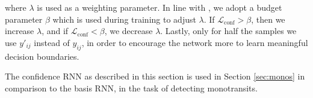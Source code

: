 \noindent where $\lambda$ is used as a weighting parameter. In line with \cite{devries2018learning}, we adopt a budget parameter $\beta$ which is used during training to adjust $\lambda$. If $\mathcal{L}_{\text{conf}} > \beta$, then we increase $\lambda$, and if $\mathcal{L}_{\text{conf}} < \beta$, we decrease $\lambda$. Lastly, only for half the samples we use $y'_{ij}$ instead of $y_{ij}$, in order to encourage the network more to learn meaningful decision boundaries. 

The confidence RNN as described in this section is used in Section \ref{sec:monos} in comparison to the basis RNN, in the task of detecting monotransits.